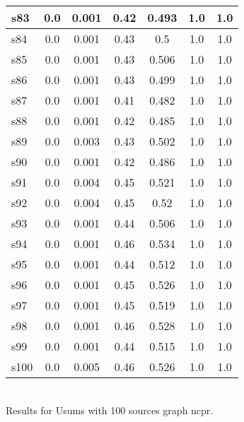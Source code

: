 \documentclass{article}
\begin{document}
\begin{tabular}{|l|c|c|c|c|c|c|}
s83 &0.0 & 0.001 & 0.42 & 0.493 & 1.0 & 1.0\\
\hline
s84 &0.0 & 0.001 & 0.43 & 0.5 & 1.0 & 1.0\\
\hline
s85 &0.0 & 0.001 & 0.43 & 0.506 & 1.0 & 1.0\\
\hline
s86 &0.0 & 0.001 & 0.43 & 0.499 & 1.0 & 1.0\\
\hline
s87 &0.0 & 0.001 & 0.41 & 0.482 & 1.0 & 1.0\\
\hline
s88 &0.0 & 0.001 & 0.42 & 0.485 & 1.0 & 1.0\\
\hline
s89 &0.0 & 0.003 & 0.43 & 0.502 & 1.0 & 1.0\\
\hline
s90 &0.0 & 0.001 & 0.42 & 0.486 & 1.0 & 1.0\\
\hline
s91 &0.0 & 0.004 & 0.45 & 0.521 & 1.0 & 1.0\\
\hline
s92 &0.0 & 0.004 & 0.45 & 0.52 & 1.0 & 1.0\\
\hline
s93 &0.0 & 0.001 & 0.44 & 0.506 & 1.0 & 1.0\\
\hline
s94 &0.0 & 0.001 & 0.46 & 0.534 & 1.0 & 1.0\\
\hline
s95 &0.0 & 0.001 & 0.44 & 0.512 & 1.0 & 1.0\\
\hline
s96 &0.0 & 0.001 & 0.45 & 0.526 & 1.0 & 1.0\\
\hline
s97 &0.0 & 0.001 & 0.45 & 0.519 & 1.0 & 1.0\\
\hline
s98 &0.0 & 0.001 & 0.46 & 0.528 & 1.0 & 1.0\\
\hline
s99 &0.0 & 0.001 & 0.44 & 0.515 & 1.0 & 1.0\\
\hline
s100 &0.0 & 0.005 & 0.46 & 0.526 & 1.0 & 1.0\\
\hline
\end{tabular}\\

\noindent Results for Usums with 100 sources graph ncpr.
\end{document}
